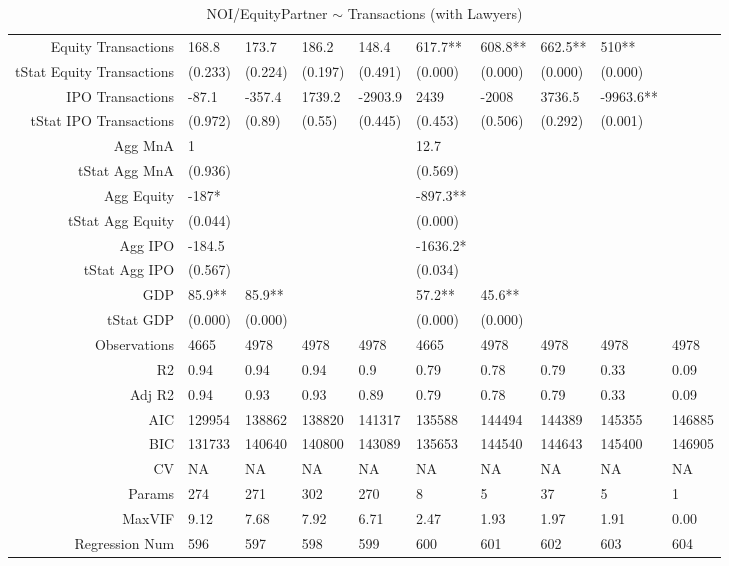 \begin{table}[ht]
\begin{tabular}{rlllllllll}
  Equity Transactions & 168.8 & 173.7 & 186.2 & 148.4 & 617.7** & 608.8** & 662.5** & 510** &  \\ 
  tStat Equity Transactions & (0.233) & (0.224) & (0.197) & (0.491) & (0.000) & (0.000) & (0.000) & (0.000) &  \\ 
  IPO Transactions & -87.1 & -357.4 & 1739.2 & -2903.9 & 2439 & -2008 & 3736.5 & -9963.6** &  \\ 
  tStat IPO Transactions & (0.972) & (0.89) & (0.55) & (0.445) & (0.453) & (0.506) & (0.292) & (0.001) &  \\ 
  Agg MnA & 1 &  &  &  & 12.7 &  &  &  &  \\ 
  tStat Agg MnA & (0.936) &  &  &  & (0.569) &  &  &  &  \\ 
  Agg Equity & -187* &  &  &  & -897.3** &  &  &  &  \\ 
  tStat Agg Equity & (0.044) &  &  &  & (0.000) &  &  &  &  \\ 
  Agg IPO & -184.5 &  &  &  & -1636.2* &  &  &  &  \\ 
  tStat Agg IPO & (0.567) &  &  &  & (0.034) &  &  &  &  \\ 
  GDP & 85.9** & 85.9** &  &  & 57.2** & 45.6** &  &  &  \\ 
  tStat GDP & (0.000) & (0.000) &  &  & (0.000) & (0.000) &  &  &  \\ 
  Observations & 4665 & 4978 & 4978 & 4978 & 4665 & 4978 & 4978 & 4978 & 4978 \\ 
  R2 & 0.94 & 0.94 & 0.94 & 0.9 & 0.79 & 0.78 & 0.79 & 0.33 & 0.09 \\ 
  Adj R2 & 0.94 & 0.93 & 0.93 & 0.89 & 0.79 & 0.78 & 0.79 & 0.33 & 0.09 \\ 
  AIC & 129954 & 138862 & 138820 & 141317 & 135588 & 144494 & 144389 & 145355 & 146885 \\ 
  BIC & 131733 & 140640 & 140800 & 143089 & 135653 & 144540 & 144643 & 145400 & 146905 \\ 
  CV & NA & NA & NA & NA & NA & NA & NA & NA & NA \\ 
  Params & 274 & 271 & 302 & 270 & 8 & 5 & 37 & 5 & 1 \\ 
  MaxVIF & 9.12 & 7.68 & 7.92 & 6.71 & 2.47 & 1.93 & 1.97 & 1.91 & 0.00 \\ 
  Regression Num & 596 & 597 & 598 & 599 & 600 & 601 & 602 & 603 & 604 \\ 
   \hline
\end{tabular}
\caption{NOI/EquityPartner $\sim$ Transactions (with Lawyers)} 
\end{table}
